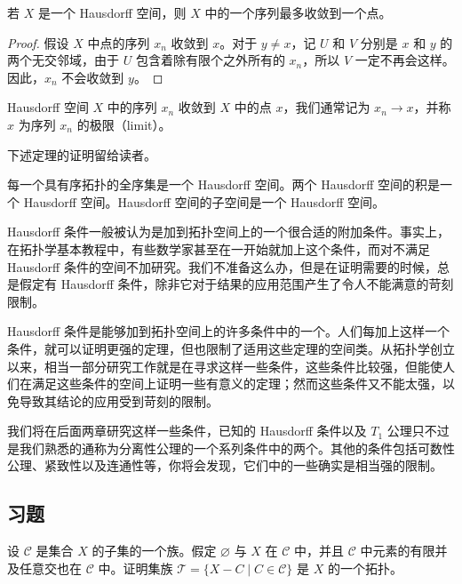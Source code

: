 \documentclass[../../main.tex]{subfiles}
\begin{document}
\begin{theorem}\label{theorem:ch02-Hausdorff极限唯一}
若 $X$ 是一个 Hausdorff 空间，则 $X$ 中的一个序列最多收敛到一个点。
\end{theorem}

\begin{proof}
假设 $X$ 中点的序列 $x_{n}$ 收敛到 $x$。对于 $y \neq x$，记 $U$ 和 $V$ 分别是 $x$ 和 $y$ 的两个无交邻域，由于 $U$ 包含着除有限个之外所有的 $x_{n}$，所以 $V$ 一定不再会这样。因此，$x_{n}$ 不会收敛到 $y$。
\end{proof}

Hausdorff 空间 $X$ 中的序列 $x_{n}$ 收敛到 $X$ 中的点 $x$，我们通常记为 $x_{n} \rightarrow x$，并称 $x$ 为序列 $x_{n}$ 的极限（limit）。

下述定理的证明留给读者。

\begin{theorem}\label{theorem:ch02-Hausdorff封闭}
每一个具有序拓扑的全序集是一个 Hausdorff 空间。两个 Hausdorff 空间的积是一个 Hausdorff 空间。Hausdorff 空间的子空间是一个 Hausdorff 空间。
\end{theorem}

Hausdorff 条件一般被认为是加到拓扑空间上的一个很合适的附加条件。事实上，在拓扑学基本教程中，有些数学家甚至在一开始就加上这个条件，而对不满足 Hausdorff 条件的空间不加研究。我们不准备这么办，但是在证明需要的时候，总是假定有 Hausdorff 条件，除非它对于结果的应用范围产生了令人不能满意的苛刻限制。

Hausdorff 条件是能够加到拓扑空间上的许多条件中的一个。人们每加上这样一个条件，就可以证明更强的定理，但也限制了适用这些定理的空间类。从拓扑学创立以来，相当一部分研究工作就是在寻求这样一些条件，这些条件比较强，但能使人们在满足这些条件的空间上证明一些有意义的定理；然而这些条件又不能太强，以免导致其结论的应用受到苛刻的限制。

我们将在后面两章研究这样一些条件，已知的 Hausdorff 条件以及 $T_{1}$ 公理只不过是我们熟悉的通称为分离性公理的一个系列条件中的两个。其他的条件包括可数性公理、紧致性以及连通性等，你将会发现，它们中的一些确实是相当强的限制。

\subsection*{习题}

\begin{exercise}\label{exercise:ch02-闭集与极限点-1}
设 $\mathcal{C}$ 是集合 $X$ 的子集的一个族。假定 $\varnothing$ 与 $X$ 在 $\mathcal{C}$ 中，并且 $\mathcal{C}$ 中元素的有限并及任意交也在 $\mathcal{C}$ 中。证明集族 $\mathcal{T} = \{X - C \mid C \in \mathcal{C}\}$ 是 $X$ 的一个拓扑。
\end{exercise}
\end{document}
